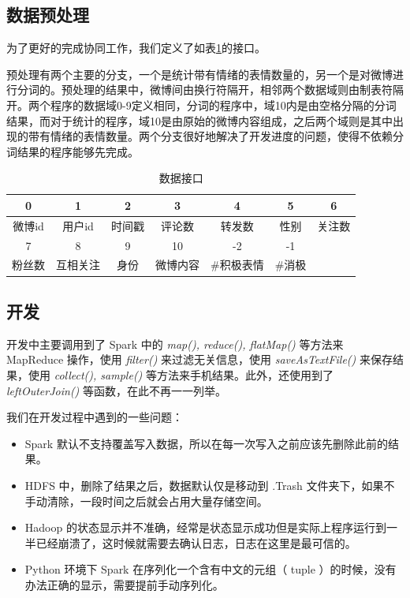 \documentclass[12pt, oneside]{article}
\begin{document}
\begin{spacing}{1.5}
\begin{CJK}{UTF8}{gbsn}
\subsection{数据预处理}
为了更好的完成协同工作，我们定义了如表\ref{tbl:interface}的接口。

预处理有两个主要的分支，一个是统计带有情绪的表情数量的，另一个是对微博进行分词的。预处理的结果中，微博间由换行符隔开，相邻两个数据域则由制表符隔开。两个程序的数据域0-9定义相同，分词的程序中，域10内是由空格分隔的分词结果，而对于统计的程序，域10是由原始的微博内容组成，之后两个域则是其中出现的带有情绪的表情数量。两个分支很好地解决了开发进度的问题，使得不依赖分词结果的程序能够先完成。


\begin{table}[]
\centering
\begin{tabular}{|c|c|c|c|c|c|c|}
\hline
0    & 1    & 2   & 3    & 4      & 5    & 6   \\ \hline
微博id & 用户id & 时间戳 & 评论数  & 转发数    & 性别   & 关注数 \\ \hline
7    & 8    & 9   & 10   & -2     & -1   &     \\ \hline
粉丝数  & 互相关注 & 身份  & 微博内容 & \#积极表情 & \#消极 &     \\ \hline
\end{tabular}
\caption{数据接口}
\label{tbl:interface}
\end{table}

\subsection{开发}
开发中主要调用到了 Spark 中的 {\it map(), reduce(), flatMap()} 等方法来 MapReduce 操作，使用 {\it filter()} 来过滤无关信息，使用 {\it saveAsTextFile()} 来保存结果，使用 {\it collect(), sample()} 等方法来手机结果。此外，还使用到了 {\it leftOuterJoin()} 等函数，在此不再一一列举。

我们在开发过程中遇到的一些问题：
\begin{itemize}
	\item Spark 默认不支持覆盖写入数据，所以在每一次写入之前应该先删除此前的结果。
	\item HDFS 中，删除了结果之后，数据默认仅是移动到 .Trash 文件夹下，如果不手动清除，一段时间之后就会占用大量存储空间。
	\item Hadoop 的状态显示并不准确，经常是状态显示成功但是实际上程序运行到一半已经崩溃了，这时候就需要去确认日志，日志在这里是最可信的。
	\item Python 环境下 Spark 在序列化一个含有中文的元组（ tuple ）的时候，没有办法正确的显示，需要提前手动序列化。
\end{itemize}


\end{CJK}
\end{spacing}
\end{document}
